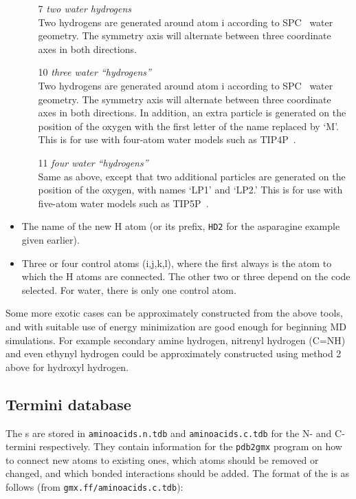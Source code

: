 \begin{itemize}
\begin{enumerate}
\item[7]{\em two water hydrogens}\\
Two hydrogens are generated around atom i according to
SPC~\cite{Berendsen81} water geometry. The symmetry axis will
alternate between three coordinate axes in both directions.

\item[10]{\em three water ``hydrogens''}\\
Two hydrogens are generated around atom i according to
SPC~\cite{Berendsen81} water geometry. The symmetry axis will
alternate between three coordinate axes in both directions. In addition,
an extra particle is generated on the position of the oxygen with
the first letter of the name replaced by `M'. This is for
use with four-atom water models such as TIP4P~\cite{Jorgensen83}.

\item[11]{\em four water ``hydrogens''}\\
Same as above, except that two additional
particles are generated on the position of the oxygen, with names
`LP1' and `LP2.' This is for
use with five-atom water models such as TIP5P~\cite{Mahoney2000a}.
\end{enumerate}

\item
The name of the new H atom (or its prefix, {\eg} {\tt HD2} for
the asparagine example given earlier).

\item
Three or four control atoms (i,j,k,l), where the first always is the
atom to which the H atoms are connected. The other two or three depend
on the code selected. For water, there is only one control atom.
\end{itemize}

Some more exotic cases can be approximately constructed from the above tools,
and with suitable use of energy minimization are good enough for beginning
MD simulations. For example secondary amine hydrogen, nitrenyl hydrogen
(C\nolinebreak[4]=\nolinebreak[4]NH) and even ethynyl hydrogen could be
approximately constructed using method 2 above for hydroxyl hydrogen.

\subsection{Termini database}
\label{subsec:tdb}
The s are stored in {\tt aminoacids.n.tdb} and
{\tt aminoacids.c.tdb} for the N- and C-termini respectively. They contain
information for the {\tt pdb2gmx} program on how to connect new atoms
to existing ones, which atoms should be removed or changed, and which
bonded interactions should be added. The format of the is as follows
(from {\tt gmx.ff/aminoacids.c.tdb}):

